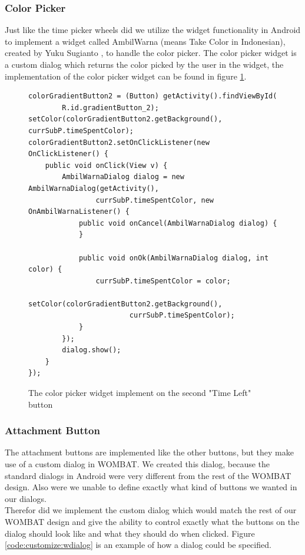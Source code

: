 \subsubsection*{Color Picker}
Just like the time picker wheels did we utilize the widget functionality in Android to implement a widget called AmbilWarna (means Take Color in Indonesian), created by Yuku Sugianto \cite{web:android:customize:color}, to handle the color picker.
The color picker widget is a custom dialog which returns the color picked by the user in the widget, the implementation of the color picker widget can be found in figure \ref{code:customize:color_picker}.
\begin{figure}[H]
\begin{verbatim}
colorGradientButton2 = (Button) getActivity().findViewById(
		R.id.gradientButton_2);
setColor(colorGradientButton2.getBackground(), currSubP.timeSpentColor);
colorGradientButton2.setOnClickListener(new OnClickListener() {
	public void onClick(View v) {
		AmbilWarnaDialog dialog = new AmbilWarnaDialog(getActivity(),
				currSubP.timeSpentColor, new OnAmbilWarnaListener() {
			public void onCancel(AmbilWarnaDialog dialog) {
			}

			public void onOk(AmbilWarnaDialog dialog, int color) {
				currSubP.timeSpentColor = color;
				setColor(colorGradientButton2.getBackground(),
						currSubP.timeSpentColor);
			}
		});
		dialog.show();
	}
});
\end{verbatim}
\caption{The color picker widget implement on the second "Time Left" button}%
\label{code:customize:color_picker}%
\end{figure}

\subsubsection*{Attachment Button}
The attachment buttons are implemented like the other buttons, but they make use of a custom dialog in WOMBAT.
We created this dialog, because the standard dialogs in Android were very different from the rest of the WOMBAT design.
Also were we unable to define exactly what kind of buttons we wanted in our dialogs.\\
Therefor did we implement the custom dialog which would match the rest of our WOMBAT design and give the ability to control exactly what the buttons on the dialog should look like and what they should do when clicked.
Figure \ref{code:customize:wdialog} is an example of how a dialog could be specified.

